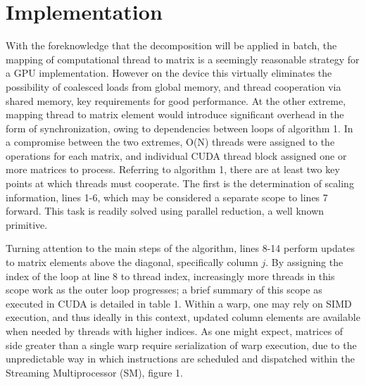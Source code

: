 \documentclass[letter, 12pt]{article}
\begin{document}
\section{Implementation}


With the foreknowledge that the decomposition will be applied in batch, the mapping of computational thread to matrix is a seemingly reasonable strategy for a GPU implementation. However on the device this virtually eliminates the possibility of coalesced loads from global memory, and thread cooperation via shared memory, key requirements for good performance. At the other extreme, mapping thread to matrix element would introduce significant overhead in the form of synchronization, owing to dependencies between loops of algorithm 1. In a compromise between the two extremes, O(N) threads were assigned to the operations for each matrix, and individual CUDA thread block assigned one or more matrices to process. Referring to algorithm 1, there are at least two key points at which threads must cooperate. The first is the determination of scaling information, lines 1-6, which may be considered a separate scope to lines 7 forward. This task is readily solved using parallel reduction, a well known primitive.

Turning attention to the main steps of the algorithm, lines 8-14 perform updates to matrix elements above the diagonal, specifically column $j$. By assigning the index of the loop at line 8 to thread index, increasingly more threads in this scope work as the outer loop progresses; a brief summary of this scope as executed in CUDA is detailed in table 1. Within a warp, one may rely on SIMD execution, and thus ideally in this context, updated column elements are available when needed by threads with higher indices. As one might expect, matrices of side greater than a single warp require serialization of warp execution, due to the unpredictable way in which instructions are scheduled and dispatched within the Streaming Multiprocessor (SM), figure 1.
\end{document}

